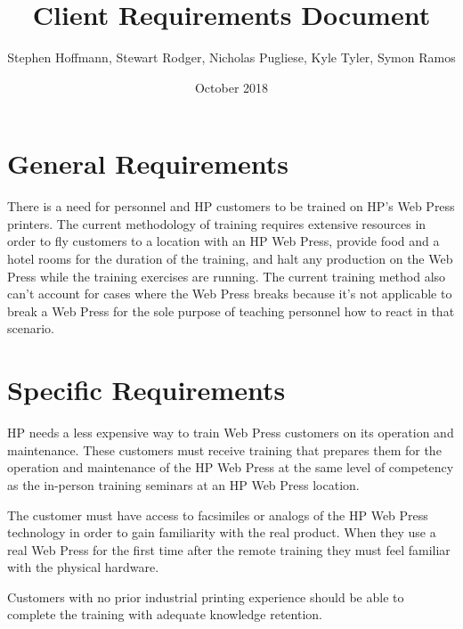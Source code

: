 \documentclass[onecolumn, draftclsnofoot,10pt, compsoc]{IEEEtran}
\title{Client Requirements Document}
\author{Stephen Hoffmann, Stewart Rodger, Nicholas Pugliese, Kyle Tyler, Symon Ramos}
\date{October 2018}
\begin{document}
\setlength\parindent{0pt}
\maketitle

\section{General Requirements}
There is a need for personnel and HP customers to be trained on HP's Web Press printers. The current methodology of training requires extensive resources in order to fly customers to a location with an HP Web Press, provide food and a hotel rooms for the duration of the training, and halt any production on the Web Press while the training exercises are running. The current training method also can't account for cases where the Web Press breaks because it's not applicable to break a Web Press for the sole purpose of teaching personnel how to react in that scenario.

\section{Specific Requirements}
HP needs a less expensive way to train Web Press customers on its operation and maintenance. These customers must receive training that prepares them for the operation and maintenance of the HP Web Press at the same level of competency as the in-person training seminars at an HP Web Press location.

The customer must have access to facsimiles or analogs of the HP Web Press technology in order to gain familiarity with the real product. When they use a real Web Press for the first time after the remote training they must feel familiar with the physical hardware.

Customers with no prior industrial printing experience should be able to complete the training with adequate knowledge retention.
\end{document}
